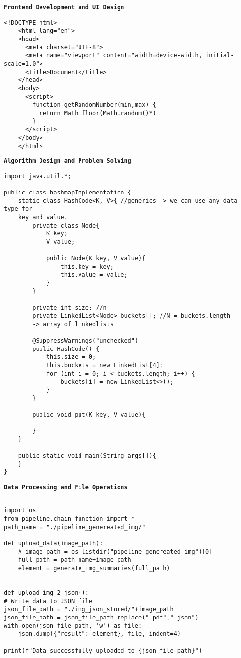 \begin{tcolorbox}
\textbf{\texttt{Frontend Development and UI Design}}
\begin{verbatim}
<!DOCTYPE html>
    <html lang="en">
    <head>
      <meta charset="UTF-8">
      <meta name="viewport" content="width=device-width, initial-scale=1.0">
      <title>Document</title>
    </head>
    <body>
      <script>
        function getRandomNumber(min,max) {
          return Math.floor(Math.random()*)
        }
      </script>
    </body>
    </html>
\end{verbatim}
\end{tcolorbox}
    
\begin{tcolorbox}
\textbf{\texttt{Algorithm Design and Problem Solving}}
\begin{verbatim}
import java.util.*;

public class hashmapImplementation {
    static class HashCode<K, V>{ //generics -> we can use any data type for 
    key and value.
        private class Node{
            K key;
            V value;

            public Node(K key, V value){
                this.key = key;
                this.value = value;
            }
        }

        private int size; //n
        private LinkedList<Node> buckets[]; //N = buckets.length   
        -> array of linkedlists

        @SuppressWarnings("unchecked")
        public HashCode() {
            this.size = 0;
            this.buckets = new LinkedList[4];
            for (int i = 0; i < buckets.length; i++) {
                buckets[i] = new LinkedList<>();
            }
        }

        public void put(K key, V value){
            
        }
    }
    
    public static void main(String args[]){
    }
}
\end{verbatim}
\end{tcolorbox}

\begin{tcolorbox}
\textbf{\texttt{Data Processing and File Operations}}
\begin{verbatim}

import os
from pipeline.chain_function import *
path_name = "./pipeline_genereated_img/"

def upload_data(image_path):
    # image_path = os.listdir("pipeline_genereated_img")[0]
    full_path = path_name+image_path
    element = generate_img_summaries(full_path)
    
    
def upload_img_2_json():
# Write data to JSON file
json_file_path = "./img_json_stored/"+image_path
json_file_path = json_file_path.replace(".pdf",".json")
with open(json_file_path, 'w') as file:
    json.dump({"result": element}, file, indent=4)

print(f"Data successfully uploaded to {json_file_path}")
    
\end{verbatim}
\end{tcolorbox}

